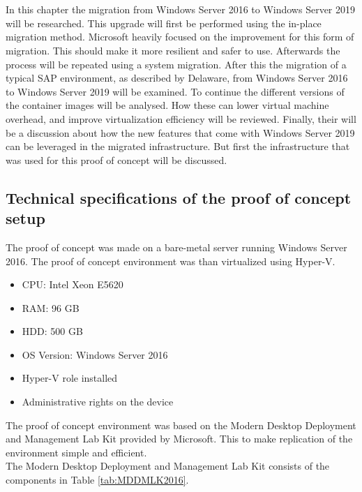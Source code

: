 \chapter{}
\label{ch:methodologie}

In this chapter the migration from Windows Server 2016 to Windows Server 2019 will be researched. This upgrade will first be performed using the in-place migration method. Microsoft heavily focused on the improvement for this form of migration. This should make it more resilient and safer to use. Afterwards the process will be repeated using a system migration. After this the migration of a typical SAP environment, as described by Delaware, from Windows Server 2016 to Windows Server 2019 will be examined. To continue the different versions of the container images will be analysed. How these can lower virtual machine overhead, and improve virtualization efficiency will be reviewed. Finally, their will be a discussion about how the new features that come with Windows Server 2019 can be leveraged in the migrated infrastructure. But first the infrastructure that was used for this proof of concept will be discussed.

\section{Technical specifications of the proof of concept setup}
The proof of concept was made on a bare-metal server running Windows Server 2016. The proof of concept environment was than virtualized using Hyper-V. 
\begin{itemize}
	\item CPU: Intel Xeon E5620
	\item RAM: 96 GB 
	\item HDD: 500 GB
	\item OS Version: Windows Server 2016
	\item Hyper-V role installed
	\item Administrative rights on the device
\end{itemize}
The proof of concept environment was based on the Modern Desktop Deployment and Management Lab Kit provided by Microsoft. \autocite{Gallagher2018}
This to make replication of the environment simple and efficient.
\\
The Modern Desktop Deployment and Management Lab Kit consists of the components in Table \ref{tab:MDDMLK2016}.
\\


